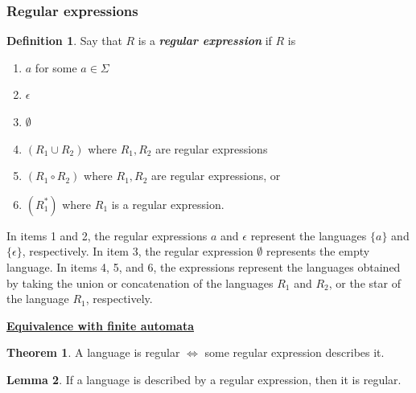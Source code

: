 \documentclass[11pt]{article}
\theoremstyle{definition}
\newtheorem{defn}{Definition}[section]
\newtheorem{thm}{Theorem}[section]
\newtheorem{lemma}[thm]{Lemma}
\begin{document}
\subsubsection{Regular expressions}
\begin{defn}
Say that $R$ is a \textbf{\textit{regular expression}} if $R$ is
\begin{enumerate}
    \item $a$ for some $a\in \Sigma$ 
    \item $\epsilon$ 
    \item $\emptyset$
    \item $(R_1\cup R_2)$ where $R_1, R_2$ are regular expressions
    \item $(R_1\circ R_2)$ where $R_1, R_2$ are regular expressions, or
    \item $(R_1^{*})$ where $R_1$ is a regular expression.
\end{enumerate}
In items 1 and 2, the regular expressions $a$ and $\epsilon$ represent the languages $\{a\}$ and $\{\epsilon\}$, respectively. In item 3, the regular expression $\emptyset$ represents the empty language. In items 4, 5, and 6, the expressions represent the languages obtained by taking the union or concatenation of the languages $R_1$ and $R_2$, or the star of the language $R_1$, respectively.
\end{defn}
\textbf{\underline{Equivalence with finite automata}}
\begin{thm}
A language is regular $\iff$ some regular expression describes it.
\end{thm}
\begin{lemma}
    If a language is described by a regular expression, then it is regular.
\end{lemma}
\end{document}
